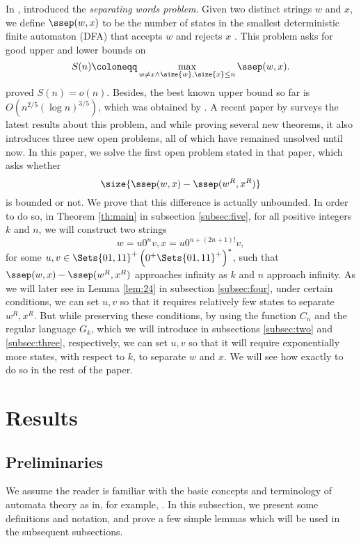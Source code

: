 \documentclass[preprint, 12pt]{elsarticle}
\begin{document}
	In \citeyear{goralvcik1986discerning2}, \citet*{goralvcik1986discerning2} introduced the \textit{separating words problem}. Given two distinct strings $w$ and $x$, we define $\ssep(w,x)$ to be the number of states in the smallest deterministic finite automaton (DFA) that accepts $w$ and rejects $x$ \cite{demaine2011remarks2}. This problem asks for good upper and lower bounds on $$S(n) \coloneqq \max_{w \neq x \land \size{w}, \size{x} \leq n} \ssep(w, x).$$
	\citet{goralvcik1986discerning2} proved $S(n) = o(n)$. Besides, the best known upper bound so far is $O(n^{2/5} \left(\log n\right)^{3/5})$, which was obtained by \citet*{Robson89,Robson96}. A recent paper by \citet*{demaine2011remarks2} surveys the latest results about this problem, and while proving several new theorems, it also introduces three new open problems, all of which have remained unsolved until now. In this paper, we solve the first open problem stated in that paper, which asks whether 
	$$\size{\ssep(w, x) - \ssep(w^R, x^R)}$$
	is bounded or not. We prove that this difference is actually unbounded. In order to do so, in Theorem \ref{th:main} in subsection \ref{subsec:five}, for all positive integers $k$ and $n$, we will construct two strings 	
	$$w = u 0^n v, x = u 0^{n + (2n+1)!} v,$$
	for some $u, v \in \Sets{01, 11}^+ \left( 0^+ \Sets{01, 11}^+\right)^*$, such that $\ssep(w, x) - \ssep(w^R, x^R)$ approaches infinity as $k$ and $n$ approach infinity. As we will later see in Lemma \ref{lem:24} in subsection \ref{subsec:four}, under certain conditions, we can set $u, v$ so that it requires relatively few states to separate $w^R, x^R$. But while preserving these conditions, by using the function $C_n$ and the regular language $G_k$, which we will introduce in subsections \ref{subsec:two} and \ref{subsec:three}, respectively, we can set $u,v$ so that it will require exponentially more states, with respect to $k$, to separate $w$ and $x$. We will see how exactly to do so in the rest of the paper.	
\section{Results}	
	\subsection{Preliminaries}
	We assume the reader is familiar with the basic concepts and terminology of automata theory as in, for example, \cite{Hopcroft}. In this subsection, we present some definitions and notation, and prove a few simple lemmas which will be used in the subsequent subsections.
	
\end{document}
